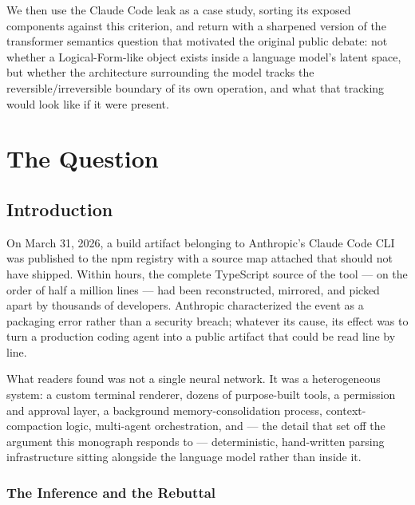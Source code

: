 \documentclass[11pt]{book}
\theoremstyle{plain}
\theoremstyle{definition}
\theoremstyle{remark}
\begin{document}
We then use the Claude Code leak as a case study, sorting its exposed
components against this criterion, and return with a sharpened version
of the transformer semantics question that motivated the original
public debate: not whether a Logical-Form-like object exists inside a
language model's latent space, but whether the architecture surrounding
the model tracks the reversible/irreversible boundary of its own
operation, and what that tracking would look like if it were present.

\newpage
\tableofcontents

\mainmatter

\part{The Question}
\chapter{Introduction}
\label{ch:introduction}

On March 31, 2026, a build artifact belonging to Anthropic's Claude
Code CLI was published to the npm registry with a source map attached
that should not have shipped. Within hours, the complete TypeScript
source of the tool --- on the order of half a million lines --- had
been reconstructed, mirrored, and picked apart by thousands of
developers. Anthropic characterized the event as a packaging error
rather than a security breach; whatever its cause, its effect was to
turn a production coding agent into a public artifact that could be
read line by line.

What readers found was not a single neural network. It was a
heterogeneous system: a custom terminal renderer, dozens of
purpose-built tools, a permission and approval layer, a background
memory-consolidation process, context-compaction logic, multi-agent
orchestration, and --- the detail that set off the argument this
monograph responds to --- deterministic, hand-written parsing
infrastructure sitting alongside the language model rather than inside
it.

\section{The Inference and the Rebuttal}
\end{document}
